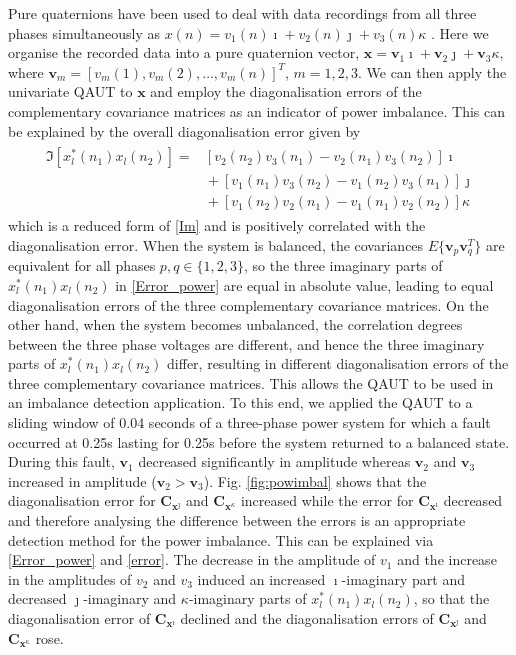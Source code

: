 \documentclass[review]{elsarticle}
\theoremstyle{plain}
\theoremstyle{remark}
\theoremstyle{plain}
\theoremstyle{definition}
\theoremstyle{prop}
\theoremstyle{definition}
\theoremstyle{plain}
\theoremstyle{plain}
\def \C {\mathbf{C}}
\def \x {\mathbf{x}}
\def \v {\mathbf{v}}
\begin{document}
Pure quaternions have been used to deal with data recordings from all three phases simultaneously as $x(n)=v_{1}(n) \imath + v_{2}(n) \jmath +v_{3}(n) \kappa $ \cite{Talebi2015a}. Here we organise the recorded data into a pure quaternion vector, $\x = \v_1 \imath + \v_2 \jmath +  \v_3 \kappa$, where $\v_m=[v_m(1),v_m(2),\ldots,v_m(n)]^T$, $m=1,2,3$. We can then apply the univariate QAUT to $\x$ and employ the diagonalisation errors of the complementary covariance matrices as an indicator of power imbalance. This can be explained by the overall diagonalisation error given by 
\begin{align}\label{Error_power}
\begin{array}{rl}
\!\!\!\!\!\!\!\mathfrak{I}\left[x_l^{*}\left(n_1\right)x_l\left(n_2\right)\right]\!\!=\!\!\!&\!\!\!\left[v_{2}\left(n_2\right)v_{3}\left(n_1\right)\!\!-\!\!v_{2}\left(n_1\right)v_{3}\left(n_2\right)\right]\imath\\\!\!&\!\!\!\!+\!\left[v_{1}\left(n_1\right)v_{3}\left(n_2\right)\!\!-\!\!v_{1}\left(n_2\right)v_{3}\left(n_1\right)\right]\!\jmath\\\!\!&\!\!\!\!+\!\left[v_{1}\left(n_2\right)v_{2}\left(n_1\right)\!\!-\!\!v_{1}\left(n_1\right)v_{2}\left(n_2\right)\right]\!\kappa
\end{array}
\end{align} 
which is a reduced form of \eqref{Im} and is positively correlated with the diagonalisation error. When the system is balanced, the covariances $E\{\v_p\v_q^T\}$ are equivalent for all phases $p, q \in \{1, 2, 3\}$, so the three imaginary parts of $x_l^{*}\left(n_1\right)x_l\left(n_2\right)$ in \eqref{Error_power} are equal in absolute value, leading to equal diagonalisation errors of the three complementary covariance matrices. On the other hand, when the system becomes unbalanced, the correlation degrees between the three phase voltages are different, and hence the three imaginary parts of $x_l^{*}\left(n_1\right)x_l\left(n_2\right)$ differ, resulting in different diagonalisation errors of the three complementary covariance matrices. This allows the QAUT to be used in an imbalance detection application. To this end, we applied the QAUT to a sliding window of 0.04 seconds of a three-phase power system for which a fault occurred at 0.25s lasting for 0.25s before the system returned to a balanced state. During this fault, $\v_1$ decreased significantly in amplitude whereas $\v_2$ and $\v_3$ increased in amplitude ($\v_2 > \v_3$). Fig. \ref{fig:powimbal} shows that the diagonalisation error for $\C_{\x^\jmath}$ and $\C_{\x^\kappa}$ increased while the error for $\C_{\x^\imath}$ decreased and therefore analysing the difference between the errors is an appropriate detection method for the power imbalance. This can be explained via \eqref{Error_power} and \eqref{error}. The decrease in the amplitude of $v_1$ and the increase in the amplitudes of $v_2$ and $v_3$ induced an increased $\imath$-imaginary part and decreased $\jmath$-imaginary and $\kappa$-imaginary parts of $x_l^{*}\left(n_1\right)x_l\left(n_2\right)$, so that the diagonalisation error of $\C_{\x^\imath}$ declined and the diagonalisation errors of $\C_{\x^\jmath}$ and $\C_{\x^\kappa}$ rose.
\end{document}
